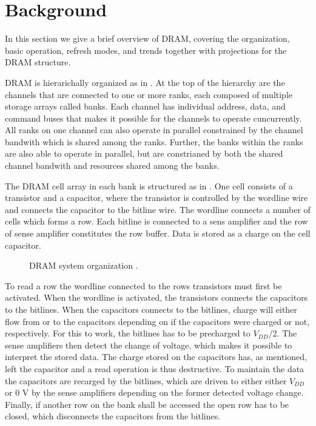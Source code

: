 \section{Background} 
\label{sec:bg}
In this section we give a brief overview of DRAM, covering the organization, basic operation, refresh modes, and trends together with projections for the DRAM structure.

DRAM is hierarichally organized as in . At the top of the hierarchy are the channels that are connected to one or more ranks, each composed of multiple storage arrays called banks. Each channel has individual address, data, and command buses that makes it possible for the channels to operate cuncurrently. All ranks on one channel can also operate in parallel constrained by the channel bandwith which is shared among the ranks. Further, the banks within the ranks are also able to operate in parallel, but are constrianed by both the shared channel bandwith and resources shared among the banks. 

The DRAM cell array in each bank is structured as in . One cell consists of a transistor and a capacitor, where the transistor is controlled by the wordline wire and connects the capacitor to the bitline wire. The wordline connects a number of cells which forms a row. Each bitline is connected to a sens amplifier and the row of sense amplifier constitutes the row buffer. Data is stored as a charge on the cell capacitor.

\begin{figure*}[t]
    \centering
	\caption{DRAM system organization \cite{raidr}.}
	\label{fig:dram_org}
\end{figure*}

To read a row the wordline connected to the rows transistors must first be activated. When the wordline is activated, the transistors connects the capacitors to the bitlines. When the capacitors connects to the bitlines, charge will either flow from or to the capacitors depending on if the capacitors were charged or not, respectively. For this to work, the bitlines has to be precharged to \(V_{DD}\)/2. The sense amplifiers then detect the change of voltage, which makes it possible to interpret the stored data. The charge stored on the capacitors has, as mentioned, left the capacitor and a read operation is thus destructive. To maintain the data the capacitors are recarged by the bitlines, which are driven to either either \(V_{DD}\) or 0 V by the sense amplifiers depending on the former detected voltage change. Finally, if another row on the bank shall be accessed the open row has to be closed, which disconnects the capacitors from the bitlines.

